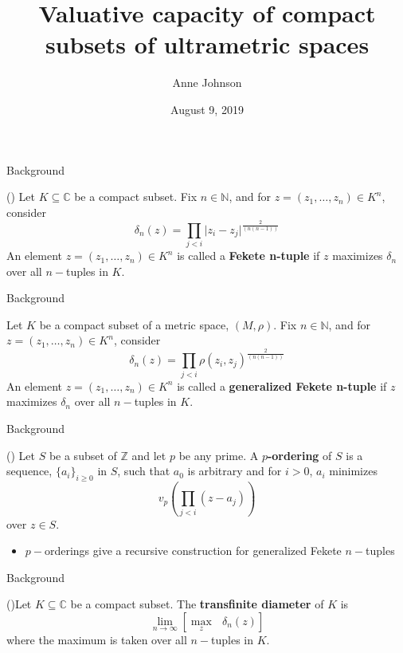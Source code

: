 \documentclass{beamer}
\title{Valuative capacity of compact subsets of ultrametric spaces}
\author{Anne Johnson}
\date{August 9, 2019}
\theoremstyle{definition}
\begin{document}
\maketitle

\begin{frame}{Background}
\begin{definition}	
(\cite{fek}) Let $K \subseteq \mathbb{C}$ be a compact subset. Fix $n \in \mathbb{N}$, and for $z = (z_1,\ldots,z_n) \in K^n$, consider
\[\delta_n(z) = \prod_{j < i} \lvert z_i - z_j \rvert^{\frac{2}{(n(n-1))}} \]
An element $z = (z_1,\ldots,z_n) \in K^n$ is called a \textbf{Fekete n-tuple} if $z$ maximizes $\delta_n$ over all $n-$tuples in $K$.
\end{definition}
\end{frame}

\begin{frame}{Background}
	\begin{definition}	
		\cite{fek} Let $K$ be a compact subset of a metric space, $(M,\rho)$. Fix $n \in \mathbb{N}$, and for $z = (z_1,\ldots,z_n) \in K^n$, consider
		\[\delta_n(z) = \prod_{j < i} \rho(z_i, z_j)^{\frac{2}{(n(n-1))}} \]
		An element $z = (z_1,\ldots,z_n) \in K^n$ is called a \textbf{generalized Fekete n-tuple} if $z$ maximizes $\delta_n$ over all $n-$tuples in $K$.
	\end{definition}
\end{frame}

\begin{frame}{Background}
 \begin{definition}
		(\cite{mb1}) Let $S$ be a subset of $\mathbb{Z}$  and let $p$ be any prime. A \textbf{$p$-ordering} of $S$ is a sequence, $\{a_i\}_{i\geq 0}$ in $S$, such that $a_0$ is arbitrary and for $i >0$, $a_i$ minimizes 
		\[ v_p (\prod_{j < i} (z - a_j) )\] over $z \in S$.\\
 \end{definition}
	\pause
 \begin{itemize}
		\item $p-$orderings give a recursive construction for generalized Fekete $n-$tuples\only<+->{!}  
 \end{itemize}	
\end{frame}

\begin{frame}{Background}
\begin{definition}	
	(\cite{fek})Let $K \subseteq \mathbb{C}$ be a compact subset. The \textbf{transfinite diameter} of $K$ is \[ \lim_{n\to\infty} [ \max_z \text{ } \delta_n(z)]\] where the maximum is taken over all $n-$tuples in $K$. %
\end{definition}
\end{frame}
\end{document}
